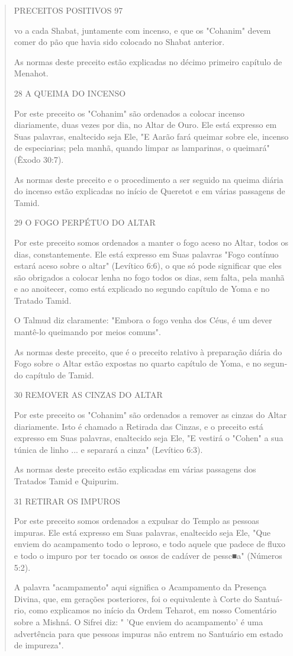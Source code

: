 \begin{quote}
PRECEITOS POSITIVOS 97

vo a cada Shabat, juntamente com incenso, e que os "Cohanim" devem comer
do pão que havia sido colocado no Shabat anterior.

As normas deste preceito estão explicadas no décimo primeiro capí­tulo
de Menahot.

28 A QUEIMA DO INCENSO

Por este preceito os "Cohanim" são ordenados a colocar incenso
diariamente, duas vezes por dia, no Altar de Ouro. Ele está expresso em
Suas palavras, enaltecido seja Ele, "E Aarão fará queimar sobre ele,
incenso de espe­ciarias; pela manhã, quando limpar as lamparinas, o
queimará" (Êxodo 30:7).

As normas deste preceito e o procedimento a ser seguido na queima diária
do incenso estão explicadas no início de Queretot e em várias passagens
de Tamid.

29 O FOGO PERPÉTUO DO ALTAR

Por este preceito somos ordenados a manter o fogo aceso no Altar, todos
os dias, constantemente. Ele está expresso em Suas palavras "Fogo
con­tínuo estará aceso sobre o altar" (Levítico 6:6), o que só pode
significar que eles são obrigados a colocar lenha no fogo todos os dias,
sem falta, pela manhã e ao anoitecer, como está explicado no segundo
capítulo de Yoma e no Trata­do Tamid.

O Talmud diz claramente: "Embora o fogo venha dos Céus, é um dever
mantê-lo queimando por meios comuns".

As normas deste preceito, que é o preceito relativo à preparação diária
do Fogo sobre o Altar estão expostas no quarto capítulo de Yoma, e no
segun­do capítulo de Tamid.

30 REMOVER AS CINZAS DO ALTAR

Por este preceito os "Cohanim" são ordenados a remover as cinzas do
Altar diariamente. Isto é chamado a Retirada das Cinzas, e o preceito
está expresso em Suas palavras, enaltecido seja Ele, "E vestirá o
"Cohen" a sua tú­nica de linho ... e separará a cinza" (Levítico 6:3).

As normas deste preceito estão explicadas em várias passagens dos
Tratados Tamid e Quipurim.

31 RETIRAR OS IMPUROS

Por este preceito somos ordenados a expulsar do Templo as pessoas
impuras. Ele está expresso em Suas palavras, enaltecido seja Ele, "Que
enviem do acampamento todo o leproso, e todo aquele que padece de fluxo
e todo o impuro por ter tocado os ossos de cadáver de pessc■a" (Números
5:2).

A palavra "acampamento" aqui significa o Acampamento da Presen­ça
Divina, que, em gerações posteriores, foi o equivalente à Corte do
Santuá­rio, como explicamos no início da Ordem Teharot, em nosso
Comentário so­bre a Mishná. O Sifrei diz: " 'Que enviem do acampamento'
é uma advertência para que pessoas impuras não entrem no Santuário em
estado de impureza".
\end{quote}

